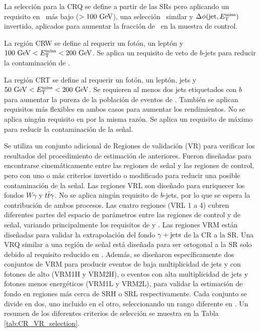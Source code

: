 La selección para la CRQ se define a partir de las SRs pero
aplicando un requisito en \met\ más bajo ($> 100\ \gev $), una selección \HT\ similar
y $ \Delta\phi(\text{jet}, E_{\text{T}}^{\text{miss}})$ invertido, aplicados para aumentar la fracción de
\phj\ en la muestra de control.

La región CRW se define al requerir un fotón, un leptón y $ 100\ \text{GeV} <E_{\text{T}}^{\text{miss}} <200 \ \text{GeV} $. Se aplica un requisito de veto de $b$-jets para reducir la contaminación de \ttbarph.

La región CRT se define al requerir un fotón, un leptón, jets y $ 50 \ \text{GeV} <E_{\text{T}}^{\text{miss}} <200 \ \text{GeV} $. Se requieren al menos dos jets etiquetados con $b$ para aumentar la pureza de la población de eventos de \ttbarph. También se aplican requisitos más flexibles en ambos casos para aumentar los rendimientos. No se aplica ningún requisito en \rtf por la misma razón. Se aplica un requisito de \met máximo para reducir la contaminación de la señal.

Se utiliza un conjunto adicional de Regiones de validación (VR) para verificar
los resultados del procedimiento de estimación de anteriores. Fueron diseñadas para encontrarse
cinemáticamente entre las regiones de señal y las regiones de control, pero con uno o más criterios
invertido o modificado para reducir una posible contaminación de la señal. Las regiones VRL son
diseñado para enriquecer los fondos $ W \gamma $ y $ t\bar{t}\gamma $. No se aplica ningún requisito de $ b $-jets,
por lo que se espera la contribución de ambos procesos. Las cuatro regiones (VRL 1 a 4) cubren
diferentes partes del espacio de parámetros entre las regiones de control y de señal, variando principalmente los requisitos de \met y \HT.
Las regiones VRM están diseñadas para validar la extrapolación del fondo $ \gamma + \text{jets}$ de la CR a la SR.
Una VRQ similar a una región de señal está diseñada para ser ortogonal a la SR solo debido al requisito reducido en \met.
Además, se diseñaron específicamente dos conjuntos de VRM para producir eventos de baja multiplicidad de jets y con fotones de alto \pt (VRM1H y VRM2H), o eventos con alta multiplicidad de jets y fotones menos energéticos (VRM1L y VRM2L), para validar la estimación de fondo en regiones
más cerca de SRH o SRL respectivamente. Cada conjunto se divide en dos, uno incluido en el otro, seleccionando un rango diferente en \met.
Un resumen de los diferentes criterios de selección se muestra en la Tabla \ref{tab:CR_VR_selection}. 

